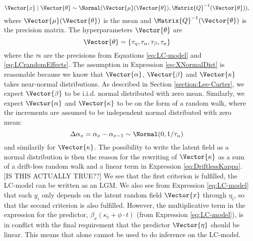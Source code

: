 \begin{equation}
        \Vector{x}\mid \Vector{\theta} \sim \Normal(\Vector{\mu}(\Vector{\theta}), \Matrix{Q}^{-1}(\Vector{\theta})),
        \label{eq:XNormalDist}
\end{equation}
where $\Vector{\mu}(\Vector{\theta})$ is the mean and $\Matrix{Q}^{-1}(\Vector{\theta})$ is the precision matrix. The hyperparameters $\Vector{\theta}$ are
\begin{equation}
    \Vector{\theta} = \{\tau_{\eta}, \tau_{\alpha}, \tau_{\beta}, \tau_{\kappa}\}
    \label{eq:LChyperparams}
\end{equation}
where the $\tau$s are the precisions from Equations \ref{eq:LC-model} and \ref{eq:LCrandomEffects}. The assumption in Expression \ref{eq:XNormalDist} is reasonable because we know that $\Vector{\alpha}$, $\Vector{\beta}$ and $\Vector{\kappa}$ takes near-normal distributions. As described in Section \ref{section:Lee-Carter}, we expect $\Vector{\beta}$ to be i.i.d. normal distributed with zero mean. Similarly, we expect $\Vector{\alpha}$ and $\Vector{\kappa}$ to be on the form of a random walk, where the increments are assumed to be independent normal distributed with zero mean: 
\begin{equation*}
    \Delta \alpha_x = \alpha_x - \alpha_{x-1} \sim \Normal(0, 1/\tau_{\alpha})
\end{equation*}
and similarily for $\Vector{\kappa}$. The possibility to write the latent field as a normal distribution is then the reason for the rewriting of $\Vector{\kappa}$ as a sum of a drift-less random walk and a linear term in Expression \ref{eq:DriftlessKappa}.[IS THIS ACTUALLY TRUE??] 
\newline
We see that the first criterion is fulfilled, the LC-model can be written as an LGM. We also see from Expression \ref{eq:LC-model} that each $y_i$ only depends on the latent random field $\Vector{x}$ through $\eta_i$, so that the second criterion is also fulfilled. However, the multiplicative term in the expression for the predictor, $\beta_x(\kappa_t + \phi\cdot t)$ (from Expression \ref{eq:LC-model}), is in conflict with the final requirement that the predictor $\Vector{\eta}$ should be linear. This means that \inla alone cannot be used to do inference on the LC-model. 

